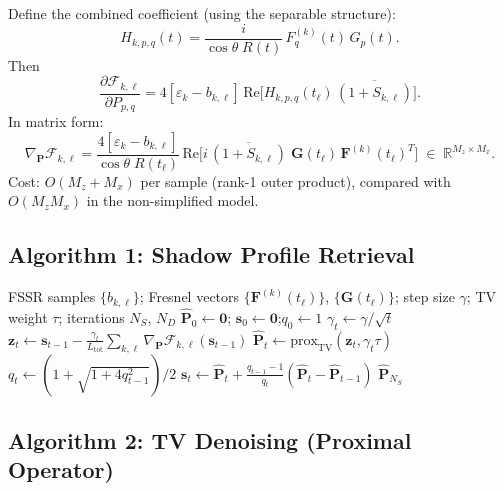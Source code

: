 \documentclass[11pt,a4paper]{article}
\newcommand{\R}{\mathbb{R}}
\newcommand{\TV}{\mathrm{TV}}
\begin{document}
Define the combined coefficient (using the separable structure):
\begin{equation}
  H_{k,p,q}(t)=\frac{i}{\cos\theta\;R(t)}\,
  F_q^{(k)}(t)\,G_p(t).
  \label{eq:Hpq}
\end{equation}
Then
\begin{equation}
  \frac{\partial\mathcal{F}_{k,\ell}}{\partial P_{p,q}}
  =4[\varepsilon_k{-}b_{k,\ell}]\,
  \mathrm{Re}\!\bigl[H_{k,p,q}(t_\ell)\,
  \overline{(1{+}S_{k,\ell})}\bigr].
  \label{eq:grad}
\end{equation}
In matrix form:
\begin{equation}
  \nabla_{\mathbf{P}}\mathcal{F}_{k,\ell}
  =\frac{4[\varepsilon_k{-}b_{k,\ell}]}{\cos\theta\;R(t_\ell)}\,
  \mathrm{Re}\!\bigl[i\,\overline{(1{+}S_{k,\ell})}\;
  \mathbf{G}(t_\ell)\,\mathbf{F}^{(k)}(t_\ell)^T\bigr]
  \;\in\;\R^{M_z\times M_x}.
  \label{eq:grad_matrix}
\end{equation}
Cost: $O(M_z+M_x)$ per sample (rank-1 outer product), compared with
$O(M_zM_x)$ in the non-simplified model.

\subsection{Algorithm 1: Shadow Profile Retrieval}

\begin{algorithm}[H]
\caption{Gradient descent with TV denoising}
\label{alg:profile}
\begin{algorithmic}[1]
\Require FSSR samples $\{b_{k,\ell}\}$; Fresnel vectors
$\{\mathbf{F}^{(k)}(t_\ell)\}$, $\{\mathbf{G}(t_\ell)\}$;
step size $\gamma$; TV weight $\tau$; iterations $N_S$, $N_D$
\State $\hat{\mathbf{P}}_0\leftarrow\mathbf{0}$;\;
$\mathbf{s}_0\leftarrow\mathbf{0}$;\;$q_0\leftarrow 1$
  \State $\gamma_t\leftarrow\gamma/\sqrt{t}$
  \State $\mathbf{z}_t\leftarrow\mathbf{s}_{t-1}
    -\frac{\gamma_t}{L_{\mathrm{tot}}}
    \sum_{k,\ell}\nabla_{\mathbf{P}}\mathcal{F}_{k,\ell}
    (\mathbf{s}_{t-1})$
  \State $\hat{\mathbf{P}}_t\leftarrow
    \mathrm{prox}_{\TV}(\mathbf{z}_t,\gamma_t\tau)$
  \State $q_t\leftarrow(1{+}\sqrt{1{+}4q_{t-1}^2})/2$
  \State $\mathbf{s}_t\leftarrow\hat{\mathbf{P}}_t
    +\frac{q_{t-1}-1}{q_t}
    (\hat{\mathbf{P}}_t{-}\hat{\mathbf{P}}_{t-1})$
\EndFor
\State \Return $\hat{\mathbf{P}}_{N_S}$
\end{algorithmic}
\end{algorithm}

\subsection{Algorithm 2: TV Denoising (Proximal Operator)}
\end{document}
